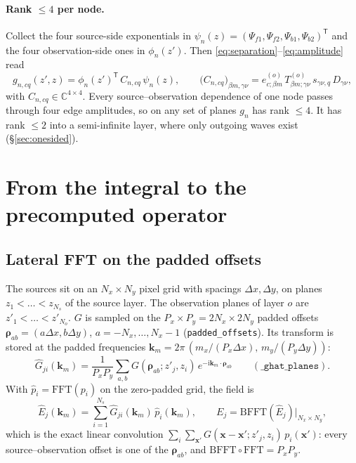 \documentclass[11pt,a4paper]{article}
\newcommand{\code}[1]{\texttt{#1}}
\newcommand{\km}{\mathbf{k}_m}
\newcommand{\bfrho}{\boldsymbol{\rho}}
\newcommand{\Ghat}{\widehat{G}}
\newcommand{\ii}{\mathrm{i}}
\theoremstyle{remark}
\begin{document}
\paragraph{Rank $\le 4$ per node.}
Collect the four source-side exponentials in $\psi_n(z) = (\Psi_{f1},\Psi_{f2},\Psi_{b1},\Psi_{b2})^{\mathsf T}$
and the four observation-side ones in $\phi_n(z')$. Then \eqref{eq:separation}--\eqref{eq:amplitude} read
\begin{equation}
  g_{n,cq}(z',z) = \phi_n(z')^{\mathsf T}\, C_{n,cq}\, \psi_n(z),
  \qquad
  \bigl(C_{n,cq}\bigr)_{\beta m,\gamma\nu} = e^{(o)}_{c;\beta m}\,T^{(o)}_{\beta m;\gamma\nu}\,s_{\gamma\nu,q}\,D_{\gamma\nu},
  \label{eq:outer}
\end{equation}
with $C_{n,cq}\in\mathbb{C}^{4\times4}$. Every source--observation dependence of one node passes through four
edge amplitudes, so on any set of planes $g_n$ has rank $\le 4$. It has rank $\le2$ into a
semi-infinite layer, where only outgoing waves exist (\S\ref{sec:onesided}).

\section{From the integral to the precomputed operator}
\label{sec:operator}

\subsection{Lateral FFT on the padded offsets}

The sources sit on an $N_x\times N_y$ pixel grid with spacings $\Delta x,\Delta y$, on planes
$z_1<\dots<z_{N_s}$ of the source layer. The observation planes of layer $o$ are
$z'_1<\dots<z'_{N_o}$. $G$ is sampled on the $P_x\times P_y=2N_x\times 2N_y$ padded offsets
$\bfrho_{ab}=(a\Delta x, b\Delta y)$, $a=-N_x,\dots,N_x-1$ (\code{padded\_offsets}). Its
transform is stored at the padded frequencies
$\km = 2\pi\,(m_x/(P_x\Delta x),\, m_y/(P_y\Delta y))$:
\begin{equation}
  \Ghat_{ji}(\km) = \frac{1}{P_xP_y}\sum_{a,b} G(\bfrho_{ab}; z'_j, z_i)\, e^{-\ii\km\cdot\bfrho_{ab}}
  \qquad(\code{\_ghat\_planes}).
  \label{eq:ghat}
\end{equation}
With $\widehat{p}_i = \mathrm{FFT}(p_i)$ on the zero-padded grid, the field is
\begin{equation}
  \widehat{E}_j(\km) = \sum_{i=1}^{N_s} \Ghat_{ji}(\km)\,\widehat{p}_i(\km),
  \qquad E_j = \mathrm{BFFT}(\widehat{E}_j)\big|_{N_x\times N_y},
  \label{eq:apply}
\end{equation}
which is the exact linear convolution $\sum_i\sum_{\mathbf{x}'} G(\mathbf{x}-\mathbf{x}'; z'_j,z_i)\,p_i(\mathbf{x}')$:
every source--observation offset is one of the $\bfrho_{ab}$, and $\mathrm{BFFT}\circ\mathrm{FFT}=P_xP_y$.
\end{document}
